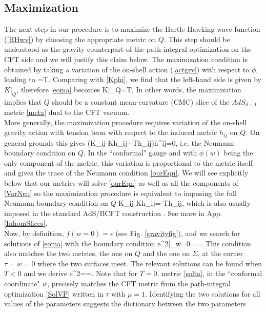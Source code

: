 \documentclass[a4paper,12pt]{article}
\begin{document}
\subsection{Maximization}
The next step in our procedure is to maximize the Hartle-Hawking wave function (\ref{HHwv}) by choosing the appropriate metric on $Q$. This step should be understood as the gravity counterpart of the path-integral optimization on the CFT side and we will justify this claim below. The maximization condition is obtained by taking a variation of the on-shell action (\ref{actgrv}) with respect to $\phi$, leading to
\ba
{}=T. \label{eoma}
\ea
Comparing with \eqref{Kphi}, we find that the left-hand side is given by $K|_Q$, therefore \eqref{eoma} becomes
\be
K|_Q=T.\label{ourEqn}
\ee
In other words, the maximization implies that $Q$ should be a constant mean-curvature (CMC) slice of the $AdS_{d+1}$ metric \eqref{metx} dual to the CFT vacuum.\\
More generally, the maximization procedure requires variation of the on-shell gravity action with tension term with respect to the induced metric $h_{ij}$ on $Q$. On general grounds this gives 
\be
(K_{ij}-Kh_{ij}+Th_{ij})\delta h^{ij}=0,\label{VarNeu}
\ee
i.e. the Neumann boundary condition on $Q$. In the ``conformal" gauge and with $\phi(w)$ being the only component of the metric, this variation is proportional to the metric itself and gives the trace of the Neumann condition \eqref{ourEqn}. We will see explicitly below that our metrics will solve \eqref{ourEqn} as well as all the components of \eqref{VarNeu} so the maximization procedure is equivalent to imposing the full Neumann boundary condition on $Q$
\ba
K_{ij}-Kh_{ij}=-Th_{ij},  \label{bdycond}
\ea
which is also usually imposed in the standard AdS/BCFT construction \cite{Ta}. See more in App. \ref{InhomSlices}. \\
Now, by definition, $f(w=0)=\epsilon$ (see Fig. \ref{gravityfig}), and we search for solutions of \eqref{eoma} with the boundary condition
\ba
e^{2\phi}|_{w=0}==. \label{bccg}
\ea
This condition also matches the two metrics, the one on $Q$ and the one on $\Sigma$, at the corner $\tau=w=0$ where the two surfaces meet. The relevant solutions can be found when $T<0$ and we derive
\ba
e^{2\phi}==.\label{solta}
\ea
Note that for $T=0$, metric \eqref{solta}, in the ``conformal coordinate" $w$, precisely matches the CFT metric from the path-integral optimization \eqref{SolVP} written in $\tau$ with $\mu=1$. Identifying the two solutions for all values of the parameters suggests the dictionary between the two parameters
\end{document}
